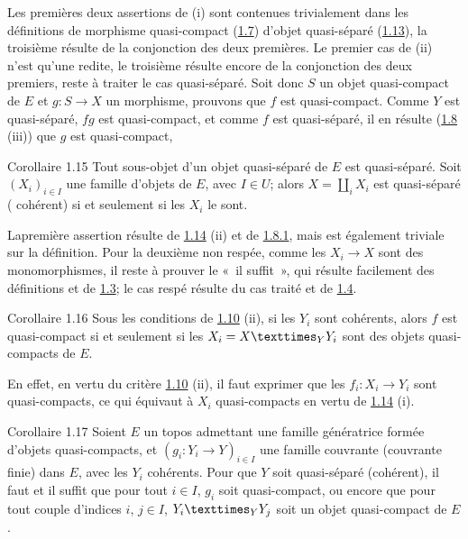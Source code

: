 \documentclass[10pt]{../fichiers-configuration-latex/smfart}
\begin{document}
Les premières deux assertions de (i) sont contenues trivialement dans
les définitions de morphisme quasi-compact (\hyperref[VI.def1.7]{1.7}) \resp d'objet
quasi-séparé (\hyperref[VI.def1.13]{1.13}), la troisième résulte de la conjonction des deux
premières. Le premier cas de (ii) n'est qu'une redite, le troisième
résulte encore de la conjonction des deux premiers, reste à traiter le
cas quasi-séparé. Soit donc $S$  un objet quasi-compact de $E$ et $g:
S\to X$ un morphisme, prouvons que $f$ est quasi-compact. Comme $Y$
est quasi-séparé, $fg$ est quasi-compact, et comme $f$ est
quasi-séparé, il en résulte (\hyperref[VI.prop1.8]{1.8} (iii)) que $g$ est quasi-compact,
\cqfd

\begin{enonce*}{Corollaire 1.15}
Tout sous-objet d'un objet quasi-séparé de $E$ est quasi-séparé. Soit
$(X_i)_{i \in I}$ une famille d'objets de $E$, avec $I \in U$; alors
$X = \amalg_i X_i$ est quasi-séparé (\emph{\resp}
cohérent) si et seulement si les $X_i$ le sont.
\end{enonce*}

La\pageoriginale première assertion résulte de \hyperref[VI.prop1.14]{1.14} (ii) et de \hyperref[VI.cor1.8.1]{1.8.1}, mais est
également triviale sur la définition. Pour la deuxième non respée,
comme les $X_i \to X$ sont des monomorphismes, il reste à prouver le
« il suffit », qui résulte facilement des définitions et de \hyperref[VI.prop1.3]{1.3}; le
cas respé résulte du cas traité et de \hyperref[VI.cor1.4]{1.4}.

\begin{enonce*}{Corollaire 1.16}
Sous les conditions de \hyperref[VI.prop1.10]{1.10} (ii), si les $Y_i$ sont cohérents, alors
$f$ est quasi-compact si et seulement si les $X_i = \fprod{X}{Y_i}{Y}$
sont des objets quasi-compacts de $E$.
\end{enonce*}

En effet, en vertu du critère \hyperref[VI.prop1.10]{1.10} (ii), il faut exprimer que les $f_i
: X_i \to Y_i$ sont quasi-compacts, ce qui équivaut à $X_i$
quasi-compacts en vertu de \hyperref[VI.prop1.14]{1.14} (i).

\begin{enonce*}{Corollaire 1.17}
Soient $E$ un topos admettant une famille génératrice formée
d'objets quasi-compacts, et $(g_i : Y_i \to Y)_{i \in I}$ une
famille couvrante (\resp couvrante finie) dans $E$, avec les $Y_i$
cohérents. Pour que $Y$ soit quasi-séparé (\resp cohérent), il faut
et il suffit que pour tout $i \in I$, $g_i$ soit quasi-compact, ou
encore que pour tout couple d'indices $i$, $j \in I$,
$\fprod{Y_i}{Y_j}{Y}$ soit un objet quasi-compact de $E$.
\end{enonce*}
\end{document}
